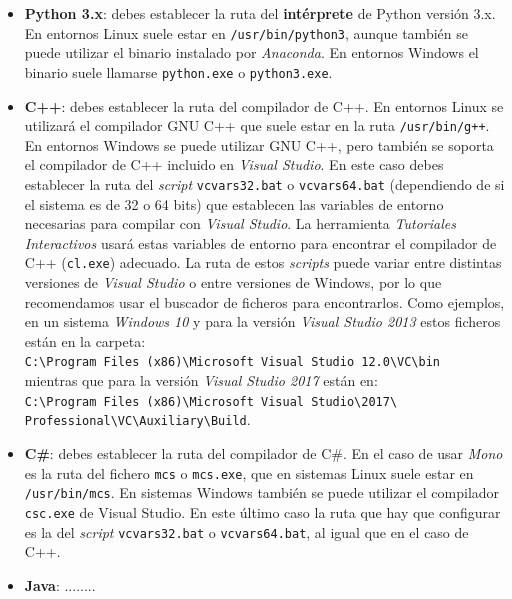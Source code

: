 \documentclass[]{article}
\newcommand{\toolname}{\emph{Tutoriales Interactivos}}
\begin{document}
\begin{itemize}
 \item \textbf{Python 3.x}: debes establecer la ruta del \textbf{intérprete} de Python versión 3.x. En entornos Linux suele estar en \texttt{/usr/bin/python3}, aunque también se puede utilizar el binario instalado por \emph{Anaconda}. En entornos Windows el binario suele llamarse \texttt{python.exe} o \texttt{python3.exe}.
 \item \textbf{C++}: debes establecer la ruta del compilador de C++. En entornos Linux se utilizará el compilador GNU C++ que suele estar en la ruta \texttt{/usr/bin/g++}. En entornos Windows se puede utilizar GNU C++, pero también se soporta el compilador de C++ incluido en \emph{Visual Studio}. En este caso debes establecer la ruta del \emph{script} \texttt{vcvars32.bat} o \texttt{vcvars64.bat} (dependiendo de si el sistema es de 32 o 64 bits) que establecen las variables de entorno necesarias para compilar con \emph{Visual Studio}. La herramienta \toolname{} usará estas variables de entorno para encontrar el compilador de C++ (\texttt{cl.exe}) adecuado. La ruta de estos \emph{scripts} puede variar entre distintas versiones de \emph{Visual Studio} o entre versiones de Windows, por lo que recomendamos usar el buscador de ficheros para encontrarlos. Como ejemplos, en un sistema \emph{Windows 10} y para la versión \emph{Visual Studio 2013} estos ficheros están en la carpeta: \\[0.2cm]
 \texttt{C:\textbackslash Program Files (x86)\textbackslash Microsoft Visual Studio 12.0\textbackslash VC\textbackslash bin}\\[0.2cm]
 mientras que para la versión \emph{Visual Studio 2017} están en:\\[0.2cm]
 \texttt{C:\textbackslash Program Files (x86)\textbackslash Microsoft Visual Studio\textbackslash 2017\textbackslash \\%
 Professional\textbackslash VC\textbackslash Auxiliary\textbackslash Build}.
 \item \textbf{C\#}: debes establecer la ruta del compilador de C\#. En el caso de usar \emph{Mono} es la ruta del fichero \texttt{mcs} o \texttt{mcs.exe}, que en sistemas Linux suele estar en \texttt{/usr/bin/mcs}. En sistemas Windows también se puede utilizar el compilador \texttt{csc.exe} de Visual Studio. En este último caso la ruta que hay que configurar es la del \emph{script} \texttt{vcvars32.bat} o \texttt{vcvars64.bat}, al igual que en el caso de C++.
 \item \textbf{Java}: ........
\end{itemize}
\end{document}
